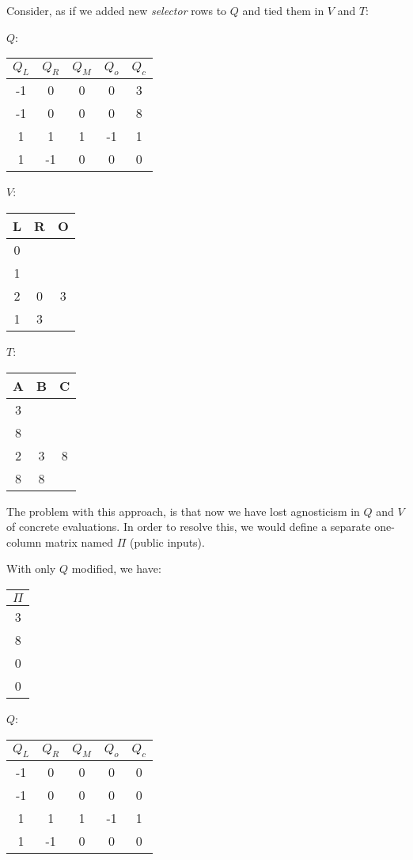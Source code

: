 \documentclass[../lecture-notes.tex]{subfiles}
\begin{document}
\begin{example}
Consider, as if we added new \textit{selector} rows to $Q$ and tied them in $V$ and $T$:

\begin{center}
$Q$: 
\begin{tabular}{|c|c|c|c|c|}
\hline
$Q_L$ & $Q_R$ & $Q_M$ & $Q_o$ & $Q_c$ \\ 
\hline
-1 & 0 & 0 & 0 & 3 \\ 
\hline
-1 & 0 & 0 & 0 & 8 \\ 
\hline
1 & 1 & 1 & -1 & 1 \\ 
\hline
1 & -1 & 0 & 0 & 0 \\ 
\hline
\end{tabular}
\quad $V$:
\begin{tabular}{|c|c|c|}
\hline
L & R & O \\
\hline
0 &  &  \\
\hline
1 &  &  \\
\hline
2 & 0 & 3 \\
\hline
1 & 3 &  \\
\hline
\end{tabular}
\quad $T$:
\begin{tabular}{|c|c|c|}
\hline
A & B & C \\
\hline
3 &  &  \\
\hline
8 &  &  \\
\hline
2 & 3 & 8 \\
\hline
8 & 8 &  \\
\hline
\end{tabular}
\end{center}
\end{example}

The problem with this approach, is that now we have lost agnosticism in $Q$ and $V$ of concrete evaluations. In order to resolve this, we would define a separate one-column matrix named $\Pi$ (public inputs).

\begin{example}
With only $Q$ modified, we have:

\centering 
\begin{center}
\begin{tabular}{|c|}
\hline
$\Pi$ \\ 
\hline
3 \\ 
\hline
8 \\ 
\hline
0 \\ 
\hline
0 \\ 
\hline
\end{tabular} \hspace{1cm}
$Q$: 
\begin{tabular}{|c|c|c|c|c|}
\hline
$Q_L$ & $Q_R$ & $Q_M$ & $Q_o$ & $Q_c$ \\ 
\hline
-1 & 0 & 0 & 0 & 0 \\ 
\hline
-1 & 0 & 0 & 0 & 0 \\ 
\hline
1 & 1 & 1 & -1 & 1 \\ 
\hline
1 & -1 & 0 & 0 & 0 \\ 
\hline
\end{tabular}
\end{center}
\end{example}
\end{document}
